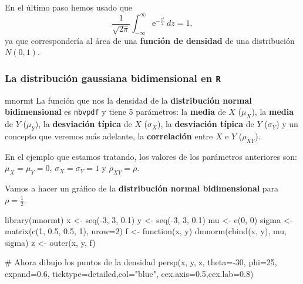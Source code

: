 \documentclass[
  letterpaper,
  DIV=11,
  numbers=noendperiod]{scrreprt}
\newenvironment{Shaded}{\begin{snugshade}}{\end{snugshade}}
\newcommand{\AttributeTok}[1]{\textcolor[rgb]{0.40,0.45,0.13}{#1}}
\newcommand{\CommentTok}[1]{\textcolor[rgb]{0.37,0.37,0.37}{#1}}
\newcommand{\ControlFlowTok}[1]{\textcolor[rgb]{0.00,0.23,0.31}{#1}}
\newcommand{\DecValTok}[1]{\textcolor[rgb]{0.68,0.00,0.00}{#1}}
\newcommand{\FloatTok}[1]{\textcolor[rgb]{0.68,0.00,0.00}{#1}}
\newcommand{\FunctionTok}[1]{\textcolor[rgb]{0.28,0.35,0.67}{#1}}
\newcommand{\NormalTok}[1]{\textcolor[rgb]{0.00,0.23,0.31}{#1}}
\newcommand{\OtherTok}[1]{\textcolor[rgb]{0.00,0.23,0.31}{#1}}
\newcommand{\SpecialCharTok}[1]{\textcolor[rgb]{0.37,0.37,0.37}{#1}}
\newcommand{\StringTok}[1]{\textcolor[rgb]{0.13,0.47,0.30}{#1}}
\begin{document}
En el último paso hemos usado que \[
\frac{1}{\sqrt{2\pi}}\int_{-\infty}^\infty \mathrm{e}^{-\frac{z^2}{2}}\, dz=1,
\] ya que correspondería al área de una \textbf{función de densidad} de
una distribución \(N(0,1)\).

\hypertarget{la-distribuciuxf3n-gaussiana-bidimensional-en-r}{%
\subsubsection{\texorpdfstring{La distribución gaussiana bidimensional
en
\texttt{R}}{La distribución gaussiana bidimensional en R}}\label{la-distribuciuxf3n-gaussiana-bidimensional-en-r}}

mnormt La función que nos la densidad de la \textbf{distribución normal
bidimensional} es \texttt{nbvpdf} y tiene 5 parámetros: la
\textbf{media} de \(X\) (\(\mu_X\)), la \textbf{media} de \(Y\)
(\(\mu_Y\)), la \textbf{desviación típica} de \(X\) (\(\sigma_X\)), la
\textbf{desviación típica} de \(Y\) (\(\sigma_Y\)) y un concepto que
veremos más adelante, la \textbf{correlación} entre \(X\) e \(Y\)
(\(\rho_{XY}\)).

En el ejemplo que estamos tratando, los valores de los parámetros
anteriores son: \(\mu_X=\mu_Y=0\), \(\sigma_X=\sigma_Y=1\) y
\(\rho_{XY}=\rho.\)

Vamos a hacer un gráfico de la \textbf{distribución normal
bidimensional} para \(\rho=\frac{1}{2}.\)

\begin{Shaded}
\begin{Highlighting}[]
\FunctionTok{library}\NormalTok{(mnormt)}
\NormalTok{x     }\OtherTok{\textless{}{-}} \FunctionTok{seq}\NormalTok{(}\SpecialCharTok{{-}}\DecValTok{3}\NormalTok{, }\DecValTok{3}\NormalTok{, }\FloatTok{0.1}\NormalTok{) }
\NormalTok{y     }\OtherTok{\textless{}{-}} \FunctionTok{seq}\NormalTok{(}\SpecialCharTok{{-}}\DecValTok{3}\NormalTok{, }\DecValTok{3}\NormalTok{, }\FloatTok{0.1}\NormalTok{)}
\NormalTok{mu    }\OtherTok{\textless{}{-}} \FunctionTok{c}\NormalTok{(}\DecValTok{0}\NormalTok{, }\DecValTok{0}\NormalTok{)}
\NormalTok{sigma }\OtherTok{\textless{}{-}} \FunctionTok{matrix}\NormalTok{(}\FunctionTok{c}\NormalTok{(}\DecValTok{1}\NormalTok{, }\FloatTok{0.5}\NormalTok{, }\FloatTok{0.5}\NormalTok{, }\DecValTok{1}\NormalTok{), }\AttributeTok{nrow=}\DecValTok{2}\NormalTok{)}
\NormalTok{f     }\OtherTok{\textless{}{-}} \ControlFlowTok{function}\NormalTok{(x, y) }\FunctionTok{dmnorm}\NormalTok{(}\FunctionTok{cbind}\NormalTok{(x, y), mu, sigma)}
\NormalTok{z     }\OtherTok{\textless{}{-}} \FunctionTok{outer}\NormalTok{(x, y, f)}

\CommentTok{\# Ahora dibujo  los puntos de la densidad}
\FunctionTok{persp}\NormalTok{(x, y, z, }\AttributeTok{theta=}\SpecialCharTok{{-}}\DecValTok{30}\NormalTok{, }\AttributeTok{phi=}\DecValTok{25}\NormalTok{, }\AttributeTok{expand=}\FloatTok{0.6}\NormalTok{,}
      \AttributeTok{ticktype=}\StringTok{\textquotesingle{}detailed\textquotesingle{}}\NormalTok{,}\AttributeTok{col=}\StringTok{"blue"}\NormalTok{,}
      \AttributeTok{cex.axis=}\FloatTok{0.5}\NormalTok{,}\AttributeTok{cex.lab=}\FloatTok{0.8}\NormalTok{)}
\end{Highlighting}
\end{Shaded}
\end{document}
